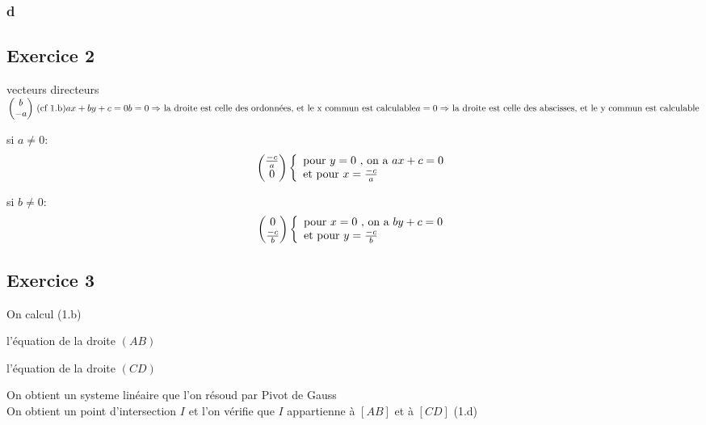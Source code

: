 \documentclass[a4paper]{article}
\begin{document}
\subsubsection{d}

\subsection{Exercice 2}  
vecteurs directeurs
\begin{math}
  \begin{pmatrix}
    b\\
    -a
  \end{pmatrix}
  $ (cf 1.b)$\\
  ax + by + c = 0 \\
  b = 0 \Rightarrow $ la droite est celle des ordonnées, et le x commun est calculable$ \\ 
  a = 0 \Rightarrow $ la droite est celle des abscisses, et le y commun est calculable$ \\
\end{math}
\begin{description}
\item si $a \neq 0$:
\[ 
\begin{pmatrix}
  \frac{-c}{a}\\
  0
\end{pmatrix}
\left\{
\begin{array}{l}
  $pour $ y = 0 $ , on a $ ax + c = 0 \\
  $et pour $ x = \frac{-c}{a}
\end{array}
\right .
\]
\item si $b \neq 0$:
\[ 
\begin{pmatrix}
  0\\
  \frac{-c}{b}
\end{pmatrix}
\left\{
\begin{array}{l}
  $pour $ x = 0 $ , on a $ by + c = 0 \\
  $et pour $ y = \frac{-c}{b}
\end{array}
\right .
\]
\end{description}
\subsection{Exercice 3}
On calcul (1.b) 
\begin{description}
\item l'équation de la droite $(AB)$
\item l'équation de la droite $(CD)$
\end{description}
On obtient un systeme linéaire que l'on résoud par Pivot de Gauss\\
On obtient un point d'intersection $I$ et l'on vérifie que $I$ appartienne à $[AB]$ et à $[CD]$ (1.d)
\end{document}
